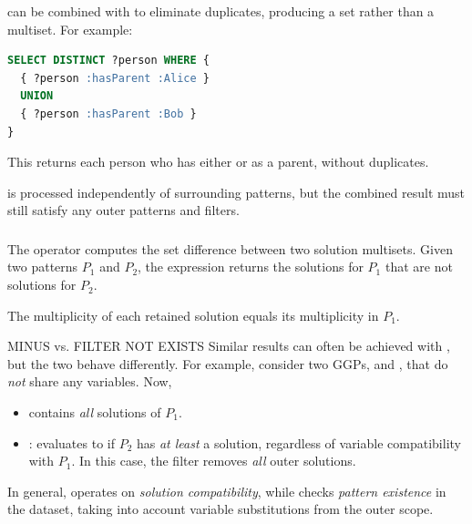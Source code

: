  can be combined with  to eliminate duplicates, producing a set rather than a multiset. 
For example:
\begin{lstlisting}[language=SQL, caption={UNION with DISTINCT}]
SELECT DISTINCT ?person WHERE {
  { ?person :hasParent :Alice }
  UNION
  { ?person :hasParent :Bob }
}
\end{lstlisting}
This returns each person who has either  or  as a parent, without duplicates.

 is processed independently of surrounding patterns, but the combined result must still satisfy any outer patterns and filters.

\subsubsection{}

The  operator computes the set difference between two solution multisets. 
Given two patterns \(P_1\) and \(P_2\), the expression  returns the solutions for \(P_1\) that are not solutions for \(P_2\).

The multiplicity of each retained solution equals its multiplicity in \(P_1\).

\begin{note}{MINUS vs. FILTER NOT EXISTS}
    Similar results can often be achieved with , but the two behave differently. For example, consider two GGPs,  and , that do \emph{not} share any variables.
    Now,
    \begin{itemize}
        \item {} contains \emph{all} solutions of \(P_1\).
        \item {}:  evaluates to  if \(P_2\) has \emph{at least} a solution, regardless of variable compatibility with \(P_1\). In this case, the filter removes \emph{all} outer solutions.
    \end{itemize}
    In general,  operates on \emph{solution compatibility}, while  checks \emph{pattern existence} in the dataset, taking into account variable substitutions from the outer scope.
\end{note}

\subsubsection{}

